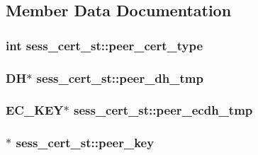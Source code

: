 \subsection{Member Data Documentation}
\hypertarget{structsess__cert__st_a42bfbd0ac3523b3dcac8cd6a93888a68}{
\subsubsection[{peer\-\_\-cert\-\_\-type}]{\setlength{\rightskip}{0pt plus 5cm}int sess\-\_\-cert\-\_\-st\-::peer\-\_\-cert\-\_\-type}}\label{structsess__cert__st_a42bfbd0ac3523b3dcac8cd6a93888a68}
\hypertarget{structsess__cert__st_a8a3ab6cdc82bf76e9696da0473e9ed0b}{
\subsubsection[{peer\-\_\-dh\-\_\-tmp}]{\setlength{\rightskip}{0pt plus 5cm}D\-H$\ast$ sess\-\_\-cert\-\_\-st\-::peer\-\_\-dh\-\_\-tmp}}\label{structsess__cert__st_a8a3ab6cdc82bf76e9696da0473e9ed0b}
\hypertarget{structsess__cert__st_a2207bc91b952ac89b19ea0bedc9d9697}{
\subsubsection[{peer\-\_\-ecdh\-\_\-tmp}]{\setlength{\rightskip}{0pt plus 5cm}E\-C\-\_\-\-K\-E\-Y$\ast$ sess\-\_\-cert\-\_\-st\-::peer\-\_\-ecdh\-\_\-tmp}}\label{structsess__cert__st_a2207bc91b952ac89b19ea0bedc9d9697}
\hypertarget{structsess__cert__st_ac2fb4296b098a8ce04891bd06e44b474}{
\subsubsection[{peer\-\_\-key}]{$\ast$ sess\-\_\-cert\-\_\-st\-::peer\-\_\-key}}\label{structsess__cert__st_ac2fb4296b098a8ce04891bd06e44b474}
